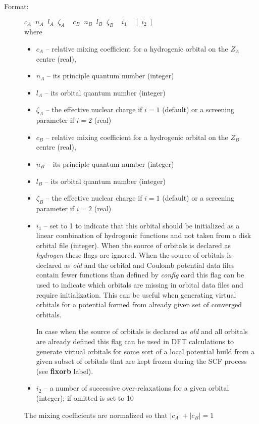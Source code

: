 \documentclass[12pt,a4paper]{article}
\newcommand{\fb}[1]{\textbf{#1}}
\begin{document}
\begin{description}
\begin{description}
\begin{description}
\item[Format:] $c_A\;\;n_A \;\;l_A \;\;\zeta_A \;\;\;\;c_B\;\;n_B\;\;l_B\;\;
  \zeta_B\;\;\;\;i_1\;\;\;\;[\;i_2\;]$ \\
where
\begin{itemize}
\item[] $c_A$ -- relative mixing coefficient for a hydrogenic orbital on the
                    $Z_A$ centre (real),
\item[] $n_A$ -- its principle quantum number (integer)
\item[] $l_A$ -- its orbital quantum number (integer)
\item[] $\zeta_A$ -- the effective nuclear charge if $i=1$ (default) or
a screening parameter if $i=2$ (real)
\item[] $c_B$  -- relative mixing coefficient for a hydrogenic orbital on the
                    $Z_B$ centre (real),
\item[] $n_B$ -- its principle quantum number (integer)
\item[] $l_B$ -- its orbital quantum number (integer)
\item[] $\zeta_B$ -- the effective nuclear charge if $i=1$ (default) or
a screening parameter if $i=2$ (real)
\item[] $i_1$ -- set to 1 to indicate that this orbital should be initialized as a linear
  combination of hydrogenic functions and not taken from a disk orbital file (integer). When
  the source of orbitals is declared as \textsl{hydrogen} these flags are ignored.
  When the source of orbitals is declared as \textsl{old} and
  the orbital and Coulomb potential data files contain fewer functions than defined by
  \textsl{config} card this flag can be used to indicate which orbitals are missing in
  orbital data files and require initialization. This can be useful when generating
  virtual orbitals for a potential formed from already given set of converged orbitals.

  In case when the source of orbitals is declared as \textsl{old} and all orbitals are
  already defined this flag can be used in DFT calculations to generate virtual orbitals
  for some sort of a local potential build from a given subset of orbitals that are kept
  frozen during the SCF process (see \fb{fixorb} label).

\item[] $i_2$ -- a number of successive over-relaxations for a given orbital
(integer); if omitted is set to 10
\end{itemize}
The mixing coefficients are normalized so that $|c_A|+|c_B|=1$


\end{description}
\end{description}
\end{description}
\end{document}
